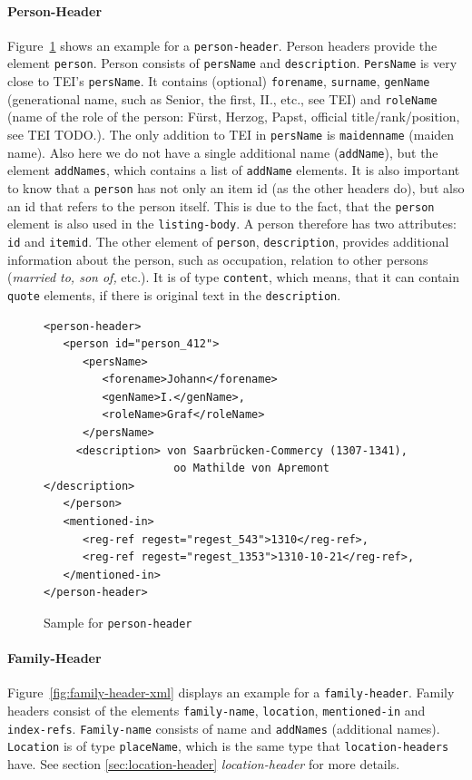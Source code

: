 \paragraph{Person-Header}
Figure~\ref{fig:person-header-xml} shows an example for a \texttt{person-header}. Person headers provide the element \texttt{person}. Person consists of \texttt{persName} and \texttt{description}. \texttt{PersName} is very close to TEI's \texttt{persName}. It contains (optional) \texttt{forename}, \texttt{surname}, \texttt{genName} (generational name, such as Senior, the first, II., etc., see TEI) and \texttt{roleName} (name of the role of the person: Fürst, Herzog, Papst, official title/rank/position, see TEI TODO.). The only addition to TEI in \texttt{persName} is \texttt{maidenname} (maiden name). Also here we do not have a single additional name (\texttt{addName}), but the element \texttt{addNames}, which contains a list of \texttt{addName} elements. It is also important to know that a \texttt{person} has not only an item id (as the other headers do), but also an id that refers to the person itself. This is due to the fact, that the \texttt{person} element is also used in the \texttt{listing-body}. A person therefore has two attributes: \texttt{id} and \texttt{itemid}.
The other element of \texttt{person}, \texttt{description}, provides additional information about the person, such as occupation, relation to other persons (\textit{married to, son of,} etc.). It is of type \texttt{content}, which means, that it can contain \texttt{quote} elements, if there is original text in the \texttt{description}.

\begin{figure}[H]
\centering
\begin{verbatim}
<person-header>
   <person id="person_412">
      <persName>
         <forename>Johann</forename> 
         <genName>I.</genName>, 
         <roleName>Graf</roleName>
      </persName>
     <description> von Saarbrücken-Commercy (1307-1341), 
                    oo Mathilde von Apremont    </description>
   </person>
   <mentioned-in>
      <reg-ref regest="regest_543">1310</reg-ref>, 
      <reg-ref regest="regest_1353">1310-10-21</reg-ref>, 
   </mentioned-in>
</person-header>
\end{verbatim}
\caption{Sample for \texttt{person-header}}
\label{fig:person-header-xml}
\end{figure}

\paragraph{Family-Header}
Figure~\ref{fig:family-header-xml} displays an example for a \texttt{family-header}. Family headers consist of the elements \texttt{family-name}, \texttt{location}, \texttt{mentioned-in} and \texttt{index-refs}. \texttt{Family-name} consists of name and \texttt{addNames} (additional names). \texttt{Location} is of type \texttt{placeName}, which is the same type that \texttt{location-headers} have. See section \ref{sec:location-header} \textit{location-header} for more details.

